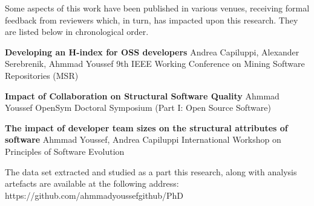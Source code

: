
\begin{publications}

Some aspects of this work have been published in various venues, receiving formal feedback from reviewers which, in turn, has impacted upon this research. They are listed below in chronological order.

\textbf{Developing an H-index for OSS developers}\newline
Andrea Capiluppi, Alexander Serebrenik, Ahmmad Youssef 9th IEEE Working Conference on Mining Software Repositories (MSR)

\textbf{Impact of Collaboration on Structural Software Quality}\newline
Ahmmad Youssef OpenSym Doctoral Symposium (Part I: Open Source Software)

\textbf{The impact of developer team sizes on the structural attributes of software}\newline
Ahmmad Youssef, Andrea Capiluppi International Workshop on Principles of Software Evolution

The data set extracted and studied as a part this research, along with analysis artefacts are available at the following address: https://github.com/ahmmadyoussefgithub/PhD
\end{publications}
